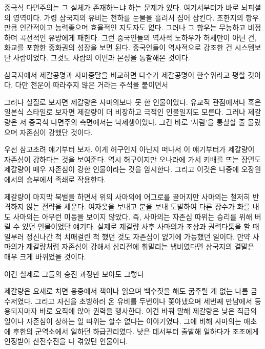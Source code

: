 중국식 다면주의는 그 실체가 존재하느냐 하는 문제가 있다. 여기서부터가 바로 뇌피셜의 영역이다.
가령 삼국지의 유비는 천하를 눈물을 흘려서 집어 삼킨다.
초한지의 항우만큼 인간적이고 능력좋으며 효율적인 지도자도 없다. 그러나 그 항우는 무능하고 비정하며 곡선적인 유방에게 패한다.
그런 중국인들의 역사적 노하우가 허세만이 아닌 건, 화교를 포함한 중화권의 성장을 보면 된다.
중국인들이 역사적으로 강조한 건 시스템보단 사람이었다. 그것도 사람의 이면과 본성을 통찰해온 것이다.
\vspace{5mm}

삼국지에서 제갈공명과 사마중달을 비교하면 다수가 제갈공명이 한수위라고 평할 것이다. 다만 천운이 따라주지 않은 거라는 주석을 붙이면서
\vspace{5mm}

그러나 실질로 보자면 제갈량은 사마의보다 못 한 인물이었다.
유교적 관점에서나 혹은 일본식 스타일로 보자면 제갈량이 더 비장하고 극적인 인물일지도 모른다.
그러나 제갈량은 저 중국식 다면주의 측면에서는 낙제생이었다.
그건 바로 '사람'을 통찰할 줄 몰랐으며 자존심이 강했단 것이다.
\vspace{5mm}

우선 삼고초려 얘기부터 보자. 이게 허구인지 아닌지 떠나서 이 얘기부터가 제갈량이 자존심이 강하다는 것을 보여준다.
역시 허구이지만 오나라에 가서 키배를 뜨는 장면도 제갈량이 매우 자존심이 강한 인물이라는 것을 암시한다.
그리고 이것은 나중에 오장원에서의 승부에서 족쇄로 작용한다.
\vspace{5mm}

제갈량이 마지막 북벌을 하면서 위의 사마의에 어그로를 끌어지만 사마의는 철저히 반격하지 않는 전략을 세운다.
여자옷을 보내고 분을 보내 도발하여 다른 장수가 화를 내도 사마의는 아무런 미동을 보이지 않았다.
즉, 사마의는 자존심 따위는 승리를 위해 버릴 수 있던 인물이었단 얘기다.
실제로 제갈량 사후 사마의가 조상과 권력다툼을 할 때 일부러 정신나간 척 치매걸린 척 했던 것도 자존심이 없기에 가능했던 일이다.
만약 사마의가 제갈량처럼 자존심이 강해서 심리전에 휘말리는 냄비였다면 삼국지의 결말은 매우 크게 바뀌었을 것이다.
\vspace{5mm}

이건 실제로 그들의 승진 과정만 보아도 그렇다
\vspace{5mm}

제갈량은 요새로 치면 융중에서 책이나 읽으며 백수짓을 해도 굶주릴 게 없는 나름 금수저였다.
그리고 자신을 초빙하러 온 유비를 두번이나 쫓아냈으며 세번째 만남에서 등용되지마자 바로 요직에 앉아 권력을 행사한다.
이건 바꿔 말해 제갈량은 낮은 직급의 일이나 자존심이 상하는 일 따위는 할수 없다는 이야기였다.
그에 비해 사마의는 애초에 후한의 군역소에서 일하던 하급관리였다.
낮은 데서부터 출발해 일하다가 조조에게 인정받아 산전수전을 다 겪었던 인물이다.
\vspace{5mm}

